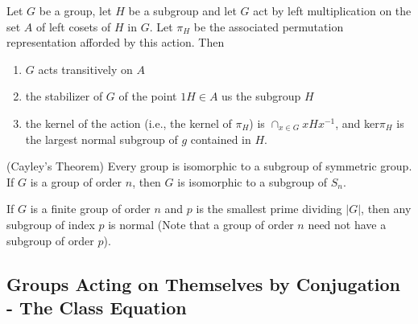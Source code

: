\documentclass[../main]{subfiles}
\begin{document}
 
 \begin{thm}
  Let $G$ be a group, let $H$ be a subgroup and let $G$ act by left multiplication on the set $A$ of left cosets of $H$ in $G$. Let $\pi_H$ be the associated permutation representation afforded by this action. Then 
  \begin{enumerate}
   \item $G$ acts transitively on $A$
   \item the stabilizer of $G$ of the point $1H\in A$ us the subgroup $H$
   \item the kernel of the action (i.e., the kernel of $\pi_H$) is $\cap_{x\in G} xHx^{-1}$, and ker$\pi_H$ is the largest normal subgroup of $g$ contained in $H$.
  \end{enumerate}
 \end{thm}
 
 
 \begin{cor}
  (Cayley's Theorem) Every group is isomorphic to a subgroup of symmetric group. If $G$ is a group of order $n$, then $G$ is isomorphic to a subgroup of $S_n$.
 \end{cor}
 
 
 \begin{cor}
  If $G$ is a finite group of order $n$ and $p$ is the smallest prime dividing $|G|$, then any subgroup of index $p$ is normal (Note that a group of order $n$ need not have a subgroup of order $p$).
 \end{cor}
 
 
 \subsection{Groups Acting on Themselves by Conjugation - The Class Equation}








 
 
 
 
 
 
 
 
 
 
 
 
 
 
 
 
 
 
 
 
 
 
 
 
 
 
 
 
 
 
 
\end{document}
